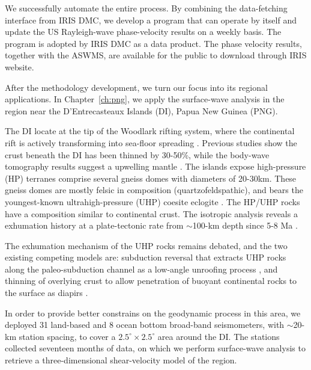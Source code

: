 \documentclass[12pt,oneside]{book}
\begin{document}
We successfully automate the entire process. By combining the data-fetching interface from IRIS DMC, we develop a program that can operate by itself and update the US Rayleigh-wave phase-velocity results on a weekly basis. The program is adopted by IRIS DMC as a data product. The phase velocity results,  together with the ASWMS, are available for the public to download through IRIS website. 

After the methodology development, we turn our focus into its regional applications. In Chapter~\ref{ch:png}, we apply the surface-wave analysis in the region near the D'Entrecasteaux Islands (DI), Papua New Guinea (PNG).

The DI locate at the tip of the Woodlark rifting system, where the continental rift is actively transforming into sea-floor spreading \citep[e.g.][]{Taylor:1999ur, Ferris:2006tr}. Previous studies show the crust beneath the DI has been thinned by 30-50\%, while the body-wave tomography results suggest a upwelling mantle \citep{Abers:2002uj, Ferris:2006tr}.
The islands expose high-pressure (HP) terranes comprise several gneiss domes with diameters of 20-30km. These gneiss domes are mostly felsic in composition (quartzofeldspathic), and bears the youngest-known ultrahigh-pressure (UHP) coesite eclogite \citep{Baldwin:2004wx, Baldwin:2008gm, Little:2011jy}. The HP/UHP rocks have a composition similar to continental crust. The isotropic analysis reveals a exhumation history at a plate-tectonic rate from $\sim$100-km depth since 5-8 Ma \citep[e.g.][]{Baldwin:2008gm, Gordon:2012hu}.

The exhumation mechanism of the UHP rocks remains debated, and the two existing competing models are: subduction reversal that extracts UHP rocks along the paleo-subduction channel as a low-angle unroofing process \citep{Hill:1992jd, Webb:2008fc}, and thinning of overlying crust to allow penetration of buoyant continental rocks to the surface as diapirs \citep{Ellis:2011jh, Little:2011jy}.

In order to provide better constrains on the geodynamic process in this area, we deployed 31 land-based and 8 ocean bottom broad-band seismometers, with $\sim$20-km station spacing, to cover a $2.5^\circ \times 2.5^\circ$ area around the DI. The stations collected seventeen months of data, on which we perform surface-wave analysis to retrieve a three-dimensional shear-velocity model of the region.
\end{document}
